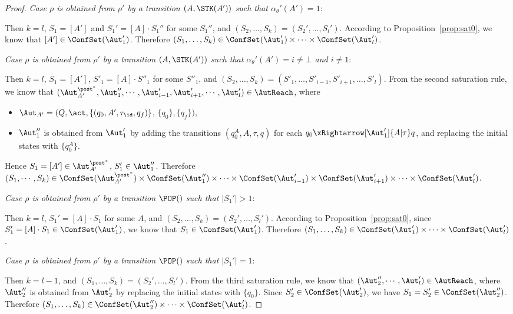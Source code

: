 \begin{proof}
\noindent \emph{Case $\rho$ is obtained from $\rho'$ by a transition $(A,\STK(A'))$ such that $\alpha_\theta'(A')=1$}: 

Then $k = l$, $S_1=[A']$ and $S_1'=[A]\cdot S_1''$ for some $S_1''$, and $(S_2,\dots,S_k)=(S_2',\dots,S_l')$.
According to Proposition~\ref{prop:sat0}, we know that $[A']\in\ConfSet(\Aut_1')$.
Therefore $(S_1,\dots,S_k)\in\ConfSet(\Aut_1')\times\cdots\times\ConfSet(\Aut_l')$.

\noindent \emph{Case $\rho$ is obtained from $\rho'$ by a transition $(A,\STK(A'))$ such that $\alpha_\theta'(A')=i\neq\bot$ and $i\neq 1$}: 

Then $k = l$, $S_1 = [A']$, $S'_1 = [A] \cdot S''_1$  for some $S''_1$, and $(S_2, \dots, S_k) = (S'_1, \dots, S'_{i-1}, S'_{i+1}, \dots, S'_l)$. From the second saturation rule, we know that $(\Aut_{A'}^{\post^*},\Aut_{1}'',\cdots,\Aut_{i-1}',\Aut_{i+1}',\cdots,\Aut_{l}')\in\AutReach$, where
        \begin{itemize}
            \item $\Aut_{A'} = (Q, \act, \{(q_0, A', \tau_{\id}, q_f)\}$, $\{q_0\},\{q_f\})$,
            \item $\Aut_1''$ is obtained from $\Aut_1'$ by adding the transitions $(q_0^{A},A,\tau,q)$ for each $q_0\xRightarrow[\Aut_1']{A | \tau} q$, and replacing the initial states with $\{q_0^{A}\}$.
        \end{itemize}
        Hence $S_1=[A']\in\Aut_{A'}^{\post^*}$, $S_1'\in\Aut_1''$. Therefore $(S_1,\cdots,S_k)\in\ConfSet(\Aut_{A'}^{\post^*})\times\ConfSet(\Aut_1'')\times\cdots\times\ConfSet(\Aut_{i-1}')\times\ConfSet(\Aut_{i+1}')\times\cdots\times\ConfSet(\Aut_{l}')$.

\noindent \emph{Case $\rho$ is obtained from $\rho'$ by a transition $\POP()$ such that $|S_1'|>1$}: 

Then $k = l$, $S_1'=[A]\cdot S_1$ for some $A$, and $(S_2,\dots,S_k)=(S_2',\dots,S_l')$.
According to Proposition~\ref{prop:sat0}, since $S_1'=[A]\cdot S_1\in\ConfSet(\Aut_1')$, we know that $S_1\in\ConfSet(\Aut_1')$.
Therefore $(S_1,\dots,S_k)\in\ConfSet(\Aut_1')\times\cdots\times\ConfSet(\Aut_l')$.

\noindent \emph{Case $\rho$ is obtained from $\rho'$ by a transition $\POP()$ such that $|S_1'|=1$}: 

Then $k = l - 1$, and $(S_1,\dots,S_k)=(S_2',\dots,S_l')$.
From the third saturation rule, we know that $(\Aut_2'',\cdots,\Aut_l')\in\AutReach$, where $\Aut_2''$ is obtained from $\Aut_2'$ by replacing the initial states with $\{q_0\}$. Since $S_2'\in\ConfSet(\Aut_2')$, we have $S_1=S_2'\in\ConfSet(\Aut_2'')$.
Therefore $(S_1,\dots,S_k)\in\ConfSet(\Aut_2'')\times\cdots\times\ConfSet(\Aut_l')$.

\end{proof}

